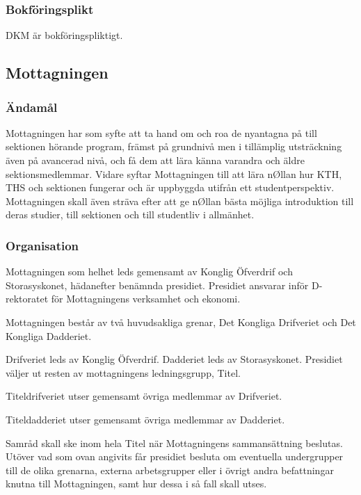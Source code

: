 \documentclass{dgovdoc}
\begin{document}
\subsubsection{Bokföringsplikt}

DKM är bokföringspliktigt.

\subsection{Mottagningen}

\subsubsection{Ändamål}

Mottagningen har som syfte att ta hand om och roa de nyantagna på till
sektionen hörande program, främst på grundnivå men i tillämplig utsträckning
även på avancerad nivå, och få dem att lära känna varandra och äldre
sektionsmedlemmar. Vidare syftar Mottagningen till att lära nØllan hur KTH, THS
och sektionen fungerar och är uppbyggda utifrån ett studentperspektiv.
Mottagningen skall även sträva efter att ge nØllan bästa möjliga introduktion
till deras studier, till sektionen och till studentliv i allmänhet.

\subsubsection{Organisation}

Mottagningen som helhet leds gemensamt av Konglig Öfverdrif och Storasyskonet,
hädanefter benämnda presidiet. Presidiet ansvarar inför D-rektoratet för
Mottagningens verksamhet och ekonomi.

Mottagningen består av två huvudsakliga grenar, Det Kongliga Drifveriet och Det
Kongliga Dadderiet.

Drifveriet leds av Konglig Öfverdrif. Dadderiet leds av Storasyskonet.
Presidiet väljer ut resten av mottagningens ledningsgrupp, Titel.

Titeldrifveriet utser gemensamt övriga medlemmar av Drifveriet.

Titeldadderiet utser gemensamt övriga medlemmar av Dadderiet.

Samråd skall ske inom hela Titel när Mottagningens sammansättning beslutas.
Utöver vad som ovan angivits får presidiet besluta om eventuella undergrupper
till de olika grenarna, externa arbetsgrupper eller i övrigt andra befattningar
knutna till Mottagningen, samt hur dessa i så fall skall utses.
\end{document}
